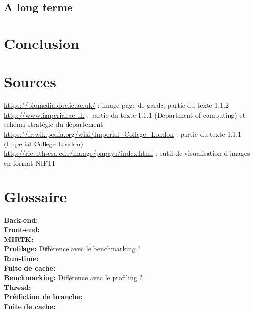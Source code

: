 \documentclass[10pt]{report}
\begin{document}
	\section{A long terme}

\chapter*{Conclusion} %
\chapter*{Sources}
\noindent
\url{https://biomedia.doc.ic.ac.uk/}  : image page de garde, partie du texte 1.1.2 \\
\url{http://www.imperial.ac.uk} : partie du texte 1.1.1 (Department of computing) et schéma stratégie du département\\
\url{https://fr.wikipedia.org/wiki/Imperial_College_London} : partie du texte 1.1.1 (Imperial College London)\\
\url{http://ric.uthscsa.edu/mango/papaya/index.html} : outil de visualisation d'images en format NIFTI
\renewcommand{\listfigurename}{Table des illustations}
\listoffigures
{}
\chapter*{Glossaire}
\noindent
\textbf{Back-end:}\\ 
\textbf{Front-end:}\\
\textbf{MIRTK:}\\
\textbf{Profilage:} Différence avec le benchmarking ?\\
\textbf{Run-time:}\\
\textbf{Fuite de cache:}\\
\textbf{Benchmarking:} Différence avec le profiling ?\\
\textbf{Thread:}\\
\textbf{Prédiction de branche:}\\
\textbf{Fuite de cache:}\\



\end{document}
